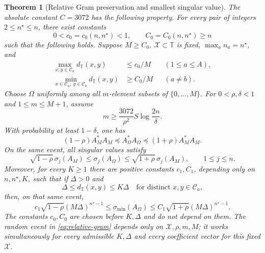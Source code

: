 \documentclass[11pt]{article}
\newtheorem{theorem}{Theorem}
\theoremstyle{remark}\newtheorem{remark}[theorem]{Remark}
\newcommand{\T}{\mathbb T}
\begin{document}
\begin{theorem}[Relative Gram preservation and smallest singular value]
\label{thm:multi-clump-random-sampling}
The absolute constant $C=3072$ has the following property.
For every pair of integers $2\le n^\star\le n$, there exist constants
\[
 0<c_0=c_0(n,n^\star)<1,\qquad C_0=C_0(n,n^\star)\ge n
\]
such that the following holds. Suppose $M\ge C_0$, $\mathcal X\subset\T$
is fixed, $\max_a n_a=n^\star$, and
\begin{align}
 \max_{x,y\in\mathcal C_a}d_\T(x,y)&\le c_0/M &&(1\le a\le A),
 \label{eq:small-clumps}\\
 \min_{x\in\mathcal C_a,\ y\in\mathcal C_b}d_\T(x,y)&\ge C_0/M
 &&(a\ne b).\label{eq:clump-separation}
\end{align}
Choose $\Omega$ uniformly among all $m$-element subsets of
$\{0,\ldots,M\}$. For $0<\rho,\delta<1$ and $1\le m\le M+1$, assume
\begin{equation}
 \label{eq:multi-clump-sampling-rate}
 m\ge \frac{3072}{\rho^2}S\log\frac{2n}{\delta}.
\end{equation}
With probability at least $1-\delta$, one has
\begin{equation}
 \label{eq:relative-gram}
 (1-\rho)A_M^*A_M\preceq A_\Omega^*A_\Omega
 \preceq(1+\rho)A_M^*A_M.
\end{equation}
On the same event, all singular values satisfy
\begin{equation}
 \label{eq:relative-singular-values}
 \sqrt{1-\rho}\,\sigma_j(A_M)\le\sigma_j(A_\Omega)
 \le\sqrt{1+\rho}\,\sigma_j(A_M),\qquad 1\le j\le n.
\end{equation}
Moreover, for every $K\ge1$ there are positive constants
$c_1,C_1$, depending only on $n,n^\star,K$, such that if $\Delta>0$ and
\begin{equation}
 \label{eq:comparable-spacing}
 \Delta\le d_\T(x,y)\le K\Delta
 \quad\text{for distinct }x,y\in\mathcal C_a,
\end{equation}
then, on that same event,
\begin{equation}
 \label{eq:sampled-smallest-singular-value}
 c_1\sqrt{1-\rho}(M\Delta)^{n^\star-1}
 \le\sigma_{\min}(A_\Omega)
 \le C_1\sqrt{1+\rho}(M\Delta)^{n^\star-1}.
\end{equation}
The constants $c_0,C_0$ are chosen before $K,\Delta$ and do not depend on
them. The random event in \eqref{eq:relative-gram} depends only on
$\mathcal X,\rho,m,M$; it works simultaneously for every admissible
$K,\Delta$ and every coefficient vector for this fixed $\mathcal X$.
\end{theorem}
\end{document}
